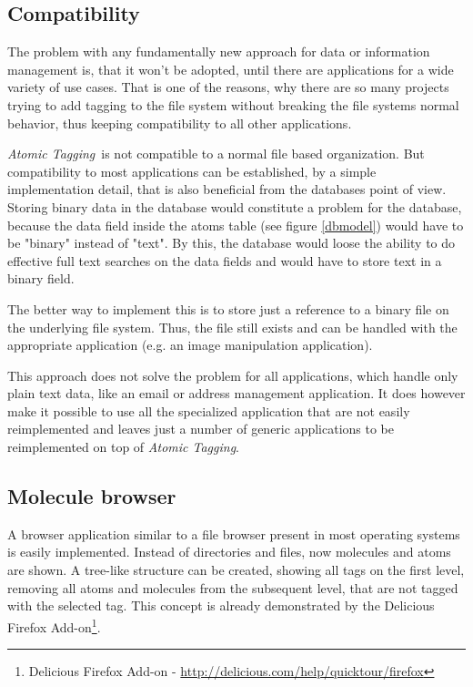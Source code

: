 \documentclass[12pt,a4paper,notitlepage,twocolumn,oneside]{article}
\newcommand{\at}{{\emph{Atomic Tagging}}}
\begin{document}
\subsection{Compatibility}\label{compatibility}
The problem with any fundamentally new approach for data or information management is, that it won't be adopted, until there are applications for a wide variety of use cases. That is one of the reasons, why there are so many projects trying to add tagging to the file system without breaking the file systems normal behavior, thus keeping compatibility to all other applications.

\at\ is not compatible to a normal file based organization. But compatibility to most applications can be established, by a simple implementation detail, that is also beneficial from the databases point of view. Storing binary data in the database would constitute a problem for the database, because the data field inside the atoms table (see figure \ref{dbmodel}) would have to be "binary" instead of "text". By this, the database would loose the ability to do effective full text searches on the data fields and would have to store text in a binary field. 

The better way to implement this is to store just a reference to a binary file on the underlying file system. Thus, the file still exists and can be handled with the appropriate application (e.g. an image manipulation application).

This approach does not solve the problem for all applications, which handle only plain text data, like an email or address management application. It does however make it possible to use all the specialized application that are not easily reimplemented and leaves just a number of generic applications to be reimplemented on top of \at{.}

\subsection{Molecule browser}\label{molecule_browser}
A browser application similar to a file browser present in most operating systems is easily implemented. Instead of directories and files, now molecules and atoms are shown. A tree-like structure can be created, showing all tags on the first level, removing all atoms and molecules from the subsequent level, that are not tagged with the selected tag. This concept is already demonstrated by the Delicious Firefox Add-on\footnote{Delicious Firefox Add-on - \url{http://delicious.com/help/quicktour/firefox}}.
\end{document}
